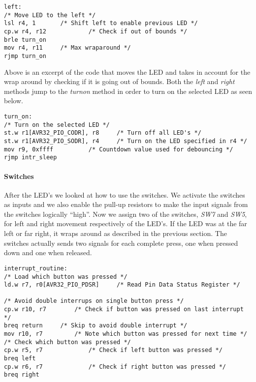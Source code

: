 \documentclass[a4paper,11pt]{article}
\begin{document}
\begin{lstlisting}
left:
/* Move LED to the left */
lsl r4, 1		/* Shift left to enable previous LED */
cp.w r4, r12        	/* Check if out of bounds */
brle turn_on
mov r4, r11		/* Max wraparound */
rjmp turn_on
\end{lstlisting}

Above is an excerpt of the code that moves the LED and takes in account for the wrap around by checking if it is going out of bounds. Both the \emph{left} and \emph{right} methods jump to the \emph{turnon} method in order to turn on the selected LED as seen below.

\begin{lstlisting}
turn_on:
/* Turn on the selected LED */
st.w r1[AVR32_PIO_CODR], r8    	/* Turn off all LED's */
st.w r1[AVR32_PIO_SODR], r4    	/* Turn on the LED specified in r4 */
mov r9, 0xffff			/* Countdown value used for debouncing */
rjmp intr_sleep
\end{lstlisting}

\paragraph{Switches}
After the LED's we looked at how to use the switches. We activate the switches as inputs and we also enable the pull-up resistors to make the input signals from the switches logically “high”. Now we assign two of the switches, \emph{SW7} and \emph{SW5}, for left and right movement respectively of the LED’s. If the LED was at the far left or far right, it wraps around as described in the previous section. The switches actually sends two signals for each complete press, one when pressed down and one when released.

\begin{lstlisting}
interrupt_routine:	
/* Load which button was pressed */ 
ld.w r7, r0[AVR32_PIO_PDSR]  	/* Read Pin Data Status Register */   

/* Avoid double interrups on single button press */
cp.w r10, r7 		/* Check if button was pressed on last interrupt */
breq return		/* Skip to avoid double interrupt */
mov r10, r7 		/* Note which button was pressed for next time */			
/* Check which button was pressed */
cp.w r5, r7             /* Check if left button was pressed */
breq left
cp.w r6, r7             /* Check if right button was pressed */
breq right

\end{lstlisting}
\end{document}
